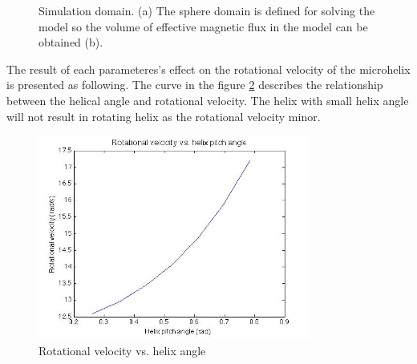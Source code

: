 \documentclass[12pt,a4paper,titlepage]{report}
\begin{document}
\begin{figure}
        \caption[Simulation domain]{Simulation domain. (a) The sphere domain is defined for solving the model so the volume of
effective magnetic flux in the model can be obtained (b).}\label{Simulation domain}

       

\end{figure}

The result of each parameteres\rq{}s effect on the rotational velocity of the microhelix is
 presented as following. The curve in the figure \ref{RV_pitchAngle} describes the relationship between
the helical angle and rotational velocity. 
The helix with small helix angle will not result in rotating 
helix as the rotational velocity minor. 

\begin{figure}
  \centering
    \includegraphics[width=0.80\textwidth]{RV_pitchAngle}
  \caption[Rotational velocity vs. helix angle]{Rotational velocity vs. helix angle}
  \label{RV_pitchAngle}
\end{figure}
\end{document}
